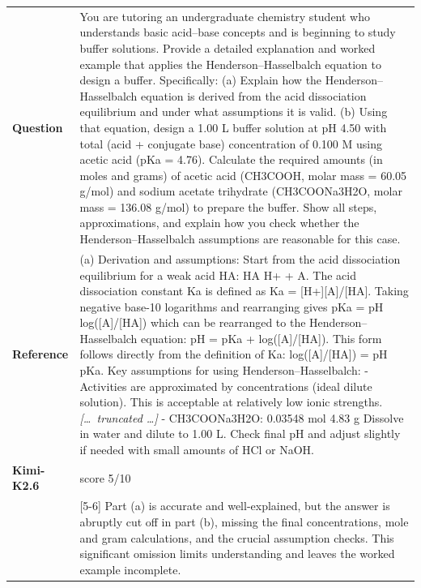 \begin{longtable}{@{}l p{12.5cm}@{}}
  \textbf{Question} & You are tutoring an undergraduate chemistry student who understands basic acid--base concepts and is beginning to study buffer solutions. Provide a detailed explanation and worked example that applies the Henderson--Hasselbalch equation to design a buffer. Specifically: (a) Explain how the Henderson--Hasselbalch equation is derived from the acid dissociation equilibrium and under what assumptions it is valid. (b) Using that equation, design a 1.00 L buffer solution at pH 4.50 with total (acid + conjugate base) concentration of 0.100 M using acetic acid (pKa = 4.76). Calculate the required amounts (in moles and grams) of acetic acid (CH3COOH, molar mass = 60.05 g/mol) and sodium acetate trihydrate (CH3COONa3H2O, molar mass = 136.08 g/mol) to prepare the buffer. Show all steps, approximations, and explain how you check whether the Henderson--Hasselbalch assumptions are reasonable for this case. \\
  \textbf{Reference} & (a) Derivation and assumptions: \newline Start from the acid dissociation equilibrium for a weak acid HA: HA H+ + A. The acid dissociation constant Ka is defined as Ka = [H+][A]/[HA]. Taking negative base-10 logarithms and rearranging gives pKa = pH log([A]/[HA]) which can be rearranged to the Henderson--Hasselbalch equation: \newline pH = pKa + log([A]/[HA]). \newline This form follows directly from the definition of Ka: log([A]/[HA]) = pH pKa. \newline Key assumptions for using Henderson--Hasselbalch: \newline - Activities are approximated by concentrations (ideal dilute solution). This is acceptable at relatively low ionic strengths. \newline \textit{[\ldots\ truncated \ldots]} \newline - CH3COONa3H2O: 0.03548 mol 4.83 g \newline Dissolve in water and dilute to 1.00 L. Check final pH and adjust slightly if needed with small amounts of HCl or NaOH. \\
  \midrule
  \textbf{Kimi-K2.6} & score 5/10 \\
  & [5-6] Part (a) is accurate and well-explained, but the answer is abruptly cut off in part (b), missing the final concentrations, mole and gram calculations, and the crucial assumption checks. This significant omission limits understanding and leaves the worked example incomplete. \\

\end{longtable}
